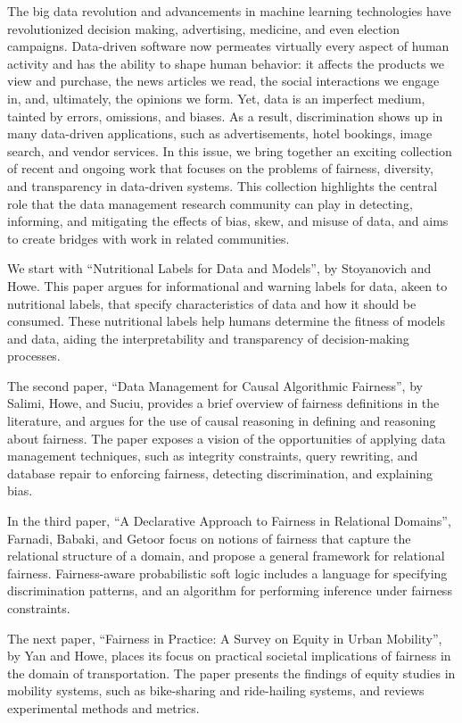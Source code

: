 \documentclass[11pt]{article}
\begin{document}
The big data revolution and advancements in machine learning
technologies have revolutionized decision making, advertising,
medicine, and even election campaigns. Data-driven software now
permeates virtually every aspect of human activity and has the
ability to shape human behavior: it affects the products we view
and purchase, the news articles we read, the social interactions we
engage in, and, ultimately, the opinions we form. Yet, data is an
imperfect medium, tainted by errors, omissions, and biases. As a
result, discrimination shows up in many data-driven applications,
such as advertisements, hotel bookings, image search, and vendor
services. In this issue, we bring together an exciting collection
of recent and ongoing work that focuses on the problems of
fairness, diversity, and transparency in data-driven systems. This
collection highlights the central role that the data management
research community can play in detecting, informing, and mitigating
the effects of bias, skew, and misuse of data, and aims to create
bridges with work in related communities.

We start with ``Nutritional Labels for Data and Models'', by
Stoyanovich and Howe. This paper argues for informational and
warning labels for data, akeen to nutritional labels, that specify
characteristics of data and how it should be consumed. These
nutritional labels help humans determine the fitness of models and
data, aiding the interpretability and transparency of
decision-making processes.

The second paper, ``Data Management for Causal Algorithmic
Fairness'', by Salimi, Howe, and Suciu, provides a brief overview
of fairness definitions in the literature, and argues for the use
of causal reasoning in defining and reasoning about fairness. The
paper exposes a vision of the opportunities of applying data
management techniques, such as integrity constraints, query
rewriting, and database repair to enforcing fairness, detecting
discrimination, and explaining bias.

In the third paper, ``A Declarative Approach to Fairness in
Relational Domains'', Farnadi, Babaki, and Getoor focus on notions
of fairness that capture the relational structure of a domain, and
propose a general framework for relational fairness. Fairness-aware
probabilistic soft logic includes a language for specifying
discrimination patterns, and an algorithm for performing inference
under fairness constraints.

The next paper, ``Fairness in Practice: A Survey on Equity in Urban
Mobility'', by Yan and Howe, places its focus on practical societal
implications of fairness in the domain of transportation. The paper
presents the findings of equity studies in mobility systems, such
as bike-sharing and ride-hailing systems, and reviews experimental
methods and metrics.
\end{document}

